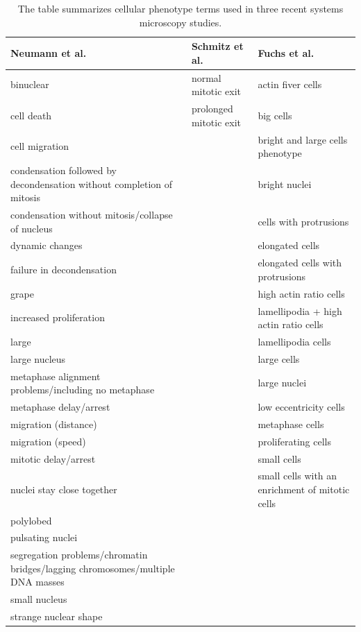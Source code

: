 \documentclass[12pt]{article}
\renewcommand{\cite}{\citep}
\begin{document}
\begin{table}
  \centering
  \begin{tabular}{|p{7cm}|l|p{4cm}|}
    Neumann et al.\cite{Neumann2010}&Schmitz et
    al.\cite{Schmitz2010}&Fuchs et al.\cite{Fuchs2010}\\
    \hline
    binuclear & normal mitotic exit & actin fiver cells\\
    cell death & prolonged mitotic exit & big cells \\
    cell migration & & bright and large cells phenotype \\
    condensation followed by decondensation without completion of
    mitosis & & bright nuclei\\
    condensation without mitosis/collapse of nucleus & & cells with protrusions\\
    dynamic changes & & elongated cells\\
    failure in decondensation & & elongated cells with protrusions\\
    grape& & high actin ratio cells \\
    increased proliferation& & lamellipodia + high actin ratio cells\\
    large& & lamellipodia cells\\
    large nucleus& & large cells\\
    metaphase alignment problems/including no metaphase& & large nuclei\\
    metaphase delay/arrest& & low eccentricity cells\\
    migration (distance)& & metaphase cells\\
    migration (speed)& & proliferating cells\\
    mitotic delay/arrest& & small cells\\
    nuclei stay close together& & small cells with an enrichment of mitotic cells\\
    polylobed& &\\
    pulsating nuclei& &\\
    segregation problems/chromatin bridges/lagging chromosomes/multiple DNA masses&&\\
    small nucleus&&\\
    strange nuclear shape&&\\
    \hline
  \end{tabular}
  \caption{\label{tbl:studies}The table summarizes cellular phenotype
    terms used in three recent systems microscopy studies.}
\end{table}
\end{document}

